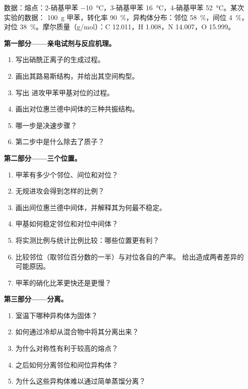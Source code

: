 \begin{problem}
\label{pb:b2:aromatic-substitution:1}
数据：熔点：2-硝基甲苯 \qty{-10}{\degreeCelsius}，3-硝基甲苯
\qty{16}{\degreeCelsius}，4-硝基甲苯 \qty{52}{\degreeCelsius}。某次实验的数据：
\qty{100}{g} 甲苯，转化率 90~\%，异构体分布：邻位 58~\%，间位 4~\%，
对位 38~\%。摩尔质量（\unit{g/mol}）：C 12.011，H 1.008，N 14.007，O 15.999。

\medskip
\noindent\textbf{第一部分——亲电试剂与反应机理。}
\begin{enumerate}
  \item 写出硝酰正离子的生成过程。
  \item 画出其路易斯结构，并给出其空间构型。
  \item 写出  进攻甲苯甲基对位的过程。
  \item 画出对位惠兰德中间体的三种共振结构。
  \item 哪一步是决速步骤？
  \item 第二步中是什么除去了质子？
\end{enumerate}

\medskip
\noindent\textbf{第二部分——三个位置。}
\begin{enumerate}[resume]
  \item 甲苯有多少个邻位、间位和对位？
  \item 无规进攻会得到怎样的比例？
  \item 画出间位惠兰德中间体，并解释其为何最不稳定。
  \item 甲基如何稳定邻位和对位中间体？
  \item 将实测比例与统计比例比较：哪些位置更有利？
  \item 比较邻位（取邻位百分数的一半）与对位各自的产率。
        给出造成两者差异的可能原因。
  \item 甲苯的硝化比苯更快还是更慢？
\end{enumerate}

\medskip
\noindent\textbf{第三部分——分离。}
\begin{enumerate}[resume]
  \item 室温下哪种异构体为固体？
  \item 如何通过冷却从混合物中将其分离出来？
  \item 为什么对称性有利于较高的熔点？
  \item 之后如何分离邻位和间位异构体？
  \item 为什么这些异构体难以通过简单蒸馏分离？
\end{enumerate}


\end{problem}
